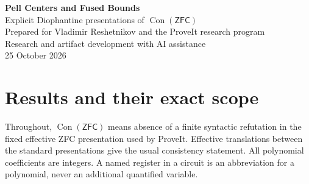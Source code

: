 \documentclass[10pt,letterpaper]{article}
\theoremstyle{remark}\newtheorem{remark}[theorem]{Remark}
\newcommand{\Con}{\operatorname{Con}}
\newcommand{\ZFC}{\mathsf{ZFC}}
\begin{document}
\begin{center}
{\Large\bfseries\color{inkblue} Pell Centers and Fused Bounds}\\[5pt]
{\large Explicit Diophantine presentations of $\Con(\ZFC)$}\\[9pt]
Prepared for Vladimir Reshetnikov and the ProveIt research program\\
Research and artifact development with AI assistance\\[4pt]
25 October 2026
\end{center}

\begin{abstract}
We give three arithmetic reductions of explicit consistency equations in
the pinned ProveIt snapshot. A polynomial Pell center replaces a large
constant in the growth certificate and yields a quartic in 212 unrestricted
integer variables. Its small-coefficient version has 152 quadratic residual
squares, 21,556 collected monomials, and coefficient height 6,432; a sparse
version has 5,290 monomials and height 277,420. A certificate shared between
the Pell-index cap and the binomial-remainder bound removes three integer
variables. Combining it with a linear Pell-orientation numerator gives an
82-variable equation of exact degree 16,964 with 1,723 live binary arithmetic
operations; companions have 81 variables at degree 2,097,732 and 106 variables
at degree 32. Separately, an odd-index Pell residue eliminates a native
transport quotient, giving a 13-positive-variable equation of degree 174
with a 69-operation evaluator.

Complete new ordinary proofs, literal equations, finite algebraic certificates,
independent checkers, and reproducible construction programs accompany this
report. Composed with the explicitly identified inherited logical
calibrations, the proofs are formalizable in ZFC and establish that the
respective equations have a zero exactly when ZFC has a finite refutation.
Global minimality and a fresh end-to-end proof-assistant compilation remain
open.
\end{abstract}

\setcounter{tocdepth}{1}
\tableofcontents
\newpage

\section{Results and their exact scope}

Throughout, $\Con(\ZFC)$ means absence of a finite syntactic refutation in
the fixed effective ZFC presentation used by ProveIt. Effective translations
between the standard presentations give the usual consistency statement.
All polynomial coefficients are integers. A named register in a circuit is
an abbreviation for a polynomial, never an additional quantified variable.
\end{document}
